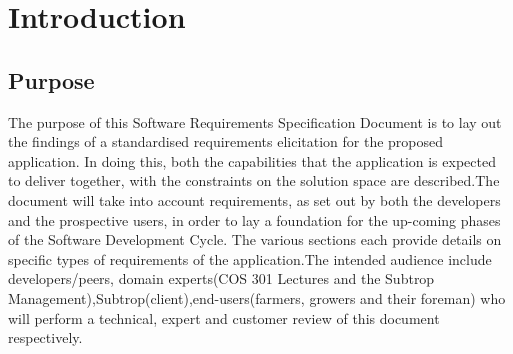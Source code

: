 \documentclass[runningheads,a4paper]{article}
\begin{document}
\begingroup

\tableofcontents
{}
\endgroup
\newpage


\section{Introduction}

\subsection{Purpose}
The purpose of this Software Requirements Specification Document is to lay out the findings of a standardised requirements elicitation for the proposed application. In doing this, both the capabilities that the application is expected to deliver together, with the constraints on the solution space are described.\newline \newline The document will take into account requirements, as set out by both the developers and the prospective users, in order to lay a foundation for the up-coming phases of the Software Development Cycle. The various sections each provide details on specific types of requirements of the application.\newline \newline The intended audience include developers/peers, domain experts(COS 301 Lectures and the Subtrop Management),Subtrop(client),end-users(farmers, growers and their foreman) who will perform a technical, expert  and customer review of this document respectively.
 
\end{document}
